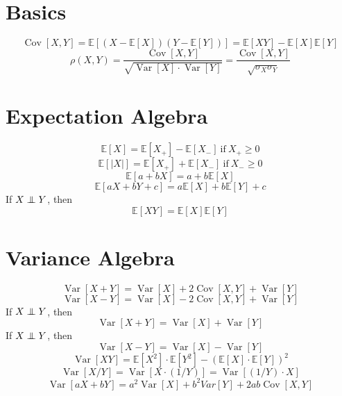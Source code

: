 \documentclass[twocolumn]{amsart}
\newcommand{\E}{\mathbb{E}}
\newcommand{\Cov}{\operatorname{Cov}}
\newcommand{\Var}{\operatorname{Var}}
\newcommand\independent{\protect\mathpalette{\protect\independenT}{\perp}}
\def\independenT#1#2{\mathrel{\rlap{$#1#2$}\mkern3mu{#1#2}}}
\begin{document}
\section*{Basics}
\begin{equation*}
  \Cov[X,Y] = \E[(X-\E[X])(Y-\E[Y])] = \E[XY] - \E[X]\E[Y]
\end{equation*}
\begin{equation*}
  \rho(X,Y) = \frac{\Cov[X,Y]}{\sqrt{\Var[X]\cdot\Var[Y]}} = \frac{\Cov[X,Y]}{\sqrt{\sigma_{X}\sigma_{Y}}}
\end{equation*}

\section*{Expectation Algebra}
\begin{equation*}
  \E[X]=\E[X_{+}] - \E[X_{-}]~\text{if}~X_{+} \geq 0
\end{equation*}
\begin{equation*}
  \E[|X|] = \E[X_{+}] + \E[X_{-}]~\text{if}~X_{-} \geq 0
\end{equation*}
\begin{equation*}
  \E[a+bX] = a + b\E[X]
\end{equation*}
\begin{equation*}
  \E[aX+bY+c] = a\E[X]+b\E[Y]+c
\end{equation*}
If \(X \independent Y\), then
\begin{equation*}
  \E[XY] = \E[X]\E[Y]
\end{equation*}

\section*{Variance Algebra}
\begin{equation*}
  \Var[X + Y] = \Var[X] + 2\Cov[X, Y] + \Var[Y]
\end{equation*}
\begin{equation*}
  \Var[X - Y] = \Var[X] - 2\Cov[X, Y] + \Var[Y]
\end{equation*}
If \(X \independent Y\), then
\begin{equation*}
  \Var[X + Y] = \Var[X] + \Var[Y]
\end{equation*}
If \(X \independent Y\), then
\begin{equation*}
  \Var[X - Y] = \Var[X] - \Var[Y]
\end{equation*}
\begin{equation*}
  \Var[XY] = \E[X^2] \cdot \E[Y^2] - {(\E[X] \cdot \E[Y])}^2
\end{equation*}
\begin{equation*}
  \Var[X/Y] = \Var[X \cdot (1/Y)] = \Var[(1/Y) \cdot X]
\end{equation*}
\begin{equation*}
  \Var[aX+bY] = a^2\Var[X] + b^2 Var[Y] + 2ab\Cov[X,Y]
\end{equation*}
\end{document}
